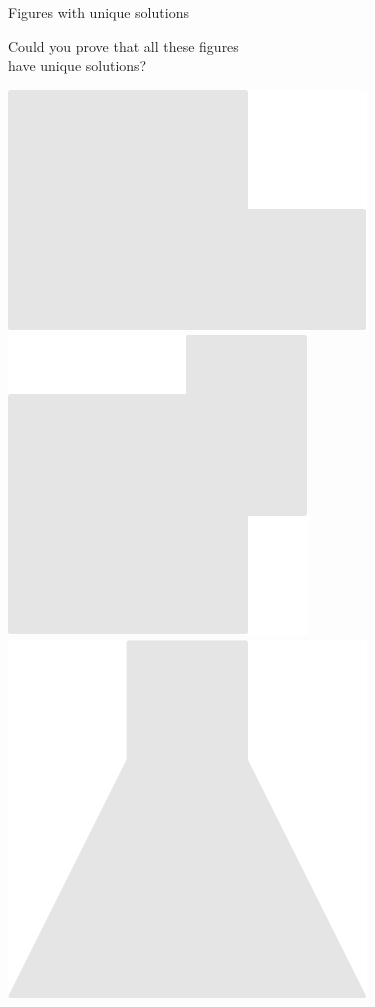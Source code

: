 \documentclass[14pt]{beamer}
\begin{document}

    \begin{frame}{Figures with unique solutions}

        \vspace{-1em}
        \begin{center}
            Could you prove that all these figures\\have unique solutions?

            \bigskip

            \includegraphics[scale=0.40]{figures/figure022e.pdf}\qquad
            \includegraphics[scale=0.40]{figures/figure022f.pdf}\qquad
            \includegraphics[scale=0.40]{figures/figure022u.pdf} \\[4ex]

\end{center}
\end{frame}
\end{document}
